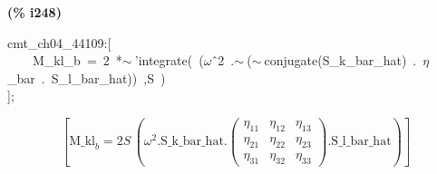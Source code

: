 \documentclass[fleqn]{article}
\begin{document}
\noindent
\begin{minipage}[t]{4.000000em}\color{red}\bfseries
(\% i248)	
\end{minipage}
\begin{minipage}[t]{\textwidth}\color{blue}
cmt\_ch04\_44109:[\\
\ \ \ \ M\_kl\_b\ =\ 2\ *\ensuremath{\sim\ }'integrate(\ (\ensuremath{\omega}\^\ 2\ .\ensuremath{\sim\ }(\ensuremath{\sim\ }conjugate(S\_k\_bar\_hat)\ .\ \ensuremath{\eta}\_bar\ .\ S\_l\_bar\_hat))\ ,S\ )\\
];
\end{minipage}
\[\displaystyle \tag{\% o248} 
\left[ {{\ensuremath{\mathrm{M\_ kl}}}_b}=2 S\, \left( {{\omega }^{2}}\ensuremath{\mathrm{ . }}\ensuremath{\mathrm{S\_ k\_ bar\_ hat}}\ensuremath{\mathrm{ . }}\begin{pmatrix}{{\eta }_{\ensuremath{\mathrm{11}}}} & {{\eta }_{\ensuremath{\mathrm{12}}}} & {{\eta }_{\ensuremath{\mathrm{13}}}}\\
{{\eta }_{\ensuremath{\mathrm{21}}}} & {{\eta }_{\ensuremath{\mathrm{22}}}} & {{\eta }_{\ensuremath{\mathrm{23}}}}\\
{{\eta }_{\ensuremath{\mathrm{31}}}} & {{\eta }_{\ensuremath{\mathrm{32}}}} & {{\eta }_{\ensuremath{\mathrm{33}}}}\end{pmatrix}\ensuremath{\mathrm{ . }}\ensuremath{\mathrm{S\_ l\_ bar\_ hat}}\right) \right] \mbox{}
\]
\end{document}
